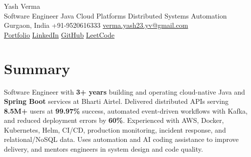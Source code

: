 \documentclass[letterpaper,11pt]{article}
\begin{document}
\begin{center}
  {\Huge Yash Verma} \\
  \small Software Engineer \textperiodcentered{} Java \textperiodcentered{} Cloud Platforms \textperiodcentered{} Distributed Systems \textperiodcentered{} Automation \\
  \vspace{5pt}
  \small Gurgaon, India \textbar{} +91-9520616333 \textbar{}
  \href{mailto:verma.yash23.yv@gmail.com}{verma.yash23.yv@gmail.com} \\
  \vspace{7pt}
  \href{https://yashverma230600.github.io/yashV-portfolio/}{Portfolio} \textbar{}
  \href{https://www.linkedin.com/in/yash-verma-9243a7193/}{LinkedIn} \textbar{}
  \href{https://github.com/yashverma230600}{GitHub} \textbar{}
  \href{https://leetcode.com/yashverma230600}{LeetCode}
  \vspace{-8pt}
\end{center}

\section{Summary}
\begin{itemize}[leftmargin=0.15in, label={}]
  \small{\item{
    Software Engineer with \textbf{3+ years} building and operating cloud-native Java and \textbf{Spring Boot} services at Bharti Airtel. Delivered distributed APIs serving \textbf{8.5M+} users at \textbf{99.97\%} success, automated event-driven workflows with Kafka, and reduced deployment errors by \textbf{60\%}. Experienced with AWS, Docker, Kubernetes, Helm, CI/CD, production monitoring, incident response, and relational/NoSQL data. Uses automation and AI coding assistance to improve delivery, and mentors engineers in system design and code quality.
  }}
\end{itemize}
\vspace{-8pt}

\end{document}
